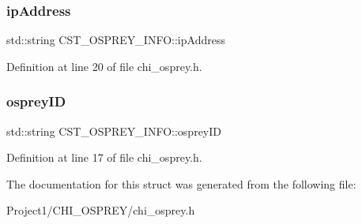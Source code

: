 \subsubsection{\texorpdfstring{ip\+Address}{ipAddress}}
{\footnotesize\ttfamily std\+::string C\+S\+T\+\_\+\+O\+S\+P\+R\+E\+Y\+\_\+\+I\+N\+F\+O\+::ip\+Address}



Definition at line 20 of file chi\+\_\+osprey.\+h.

\mbox{\label{struct_c_s_t___o_s_p_r_e_y___i_n_f_o_a4aeec24f34c07993a2f44ac2f59bd163}} 
\subsubsection{\texorpdfstring{osprey\+ID}{ospreyID}}
{\footnotesize\ttfamily std\+::string C\+S\+T\+\_\+\+O\+S\+P\+R\+E\+Y\+\_\+\+I\+N\+F\+O\+::osprey\+ID}



Definition at line 17 of file chi\+\_\+osprey.\+h.



The documentation for this struct was generated from the following file\+:\begin{DoxyCompactItemize}
\item 
Project1/\+C\+H\+I\+\_\+\+O\+S\+P\+R\+E\+Y/chi\+\_\+osprey.\+h\end{DoxyCompactItemize}
